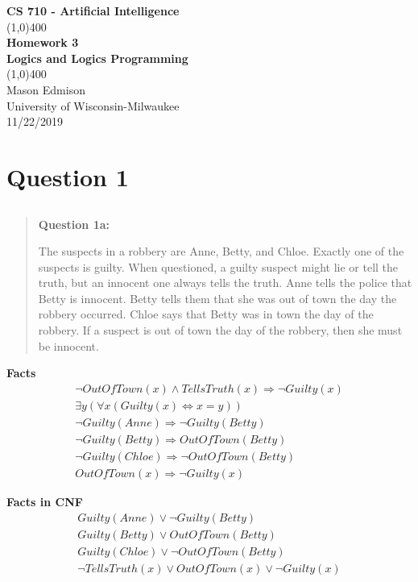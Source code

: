 \documentclass[11pt]{article}
\begin{document}
\begin{titlepage}
\begin{center}
\Large{\textbf{CS 710 - Artificial Intelligence}} \\
\vfill
\line(1,0){400} \\
\huge{\textbf{Homework 3}} \\
\Large{\textbf{Logics and Logics Programming}} \\
\line(1,0){400}\\
\vfill
Mason Edmison\\
University of Wisconsin-Milwaukee\\
11/22/2019
\end{center}
\end{titlepage}

\section{Question 1}
\subsection{}
\begin{quote}
    \textbf{Question 1a:} 

The suspects in a robbery are Anne, Betty, and Chloe.
Exactly one of the suspects is guilty.
When questioned, a guilty suspect might lie or tell the truth, but an innocent one always tells the truth.
Anne tells the police that Betty is innocent.
Betty tells them that she was out of town the day the robbery occurred.
Chloe says that Betty was in town the day of the robbery.
If a suspect is out of town the day of the robbery, then she must be innocent.
\end{quote}

\large \textbf{Facts}
\begin{align}
\lnot OutOfTown(x) \land TellsTruth(x) \Rightarrow \lnot Guilty(x) \\
\exists y(\forall x(Guilty(x) \Leftrightarrow x=y)) \\ 
\lnot Guilty(Anne) \Rightarrow \lnot Guilty(Betty) \\ 
\lnot Guilty(Betty) \Rightarrow OutOfTown(Betty) \\  
\lnot Guilty(Chloe) \Rightarrow \lnot OutOfTown(Betty) \\  
OutOfTown(x) \Rightarrow \lnot Guilty(x)
\end{align}

\large \textbf{Facts in CNF}
\begin{align}
Guilty(Anne) \lor \lnot Guilty(Betty) \\
Guilty(Betty)  \lor OutOfTown(Betty) \\
Guilty(Chloe) \lor \lnot OutOfTown(Betty) \\
\lnot TellsTruth(x) \lor  OutOfTown(x) \lor \lnot Guilty(x)
\end{align}
\end{document}

